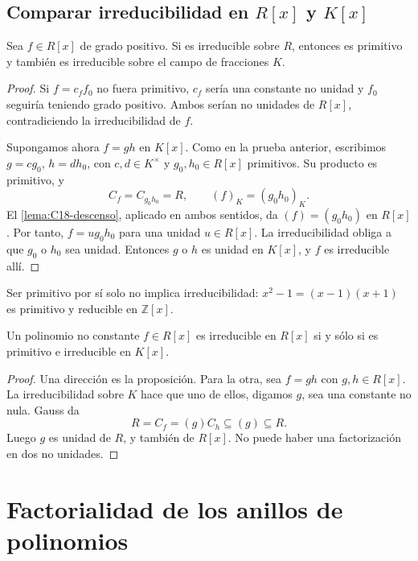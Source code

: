 \subsection{Comparar irreducibilidad en \texorpdfstring{$R[x]$ y $K[x]$}{R[x] y K[x]}}
\begin{prop}\label{prop:C18-irred-fracciones}
Sea $f\in R[x]$ de grado positivo. Si es irreducible sobre $R$, entonces es primitivo y también es irreducible sobre el campo de fracciones $K$.
\end{prop}
\begin{proof}
Si $f=c_ff_0$ no fuera primitivo, $c_f$ sería una constante no unidad y $f_0$ seguiría teniendo grado positivo. Ambos serían no unidades de $R[x]$, contradiciendo la irreducibilidad de $f$.

Supongamos ahora $f=gh$ en $K[x]$. Como en la prueba anterior, escribimos $g=cg_0$, $h=dh_0$, con $c,d\in K^\times$ y $g_0,h_0\in R[x]$ primitivos. Su producto es primitivo, y
\[
C_f=C_{g_0h_0}=R,\qquad (f)_K=(g_0h_0)_K.
\]
El \cref{lema:C18-descenso}, aplicado en ambos sentidos, da $(f)=(g_0h_0)$ en $R[x]$. Por tanto, $f=ug_0h_0$ para una unidad $u\in R[x]$. La irreducibilidad obliga a que $g_0$ o $h_0$ sea unidad. Entonces $g$ o $h$ es unidad en $K[x]$, y $f$ es irreducible allí.
\end{proof}
Ser primitivo por sí solo no implica irreducibilidad: $x^2-1=(x-1)(x+1)$ es primitivo y reducible en $\mathbb Z[x]$.

\begin{coro}\label{coro:C18-criterio-irred}
Un polinomio no constante $f\in R[x]$ es irreducible en $R[x]$ si y sólo si es primitivo e irreducible en $K[x]$.
\end{coro}
\begin{proof}
Una dirección es la proposición. Para la otra, sea $f=gh$ con $g,h\in R[x]$. La irreducibilidad sobre $K$ hace que uno de ellos, digamos $g$, sea una constante no nula. Gauss da
\[
R=C_f=(g)C_h\subseteq(g)\subseteq R.
\]
Luego $g$ es unidad de $R$, y también de $R[x]$. No puede haber una factorización en dos no unidades.
\end{proof}

\section{Factorialidad de los anillos de polinomios}
